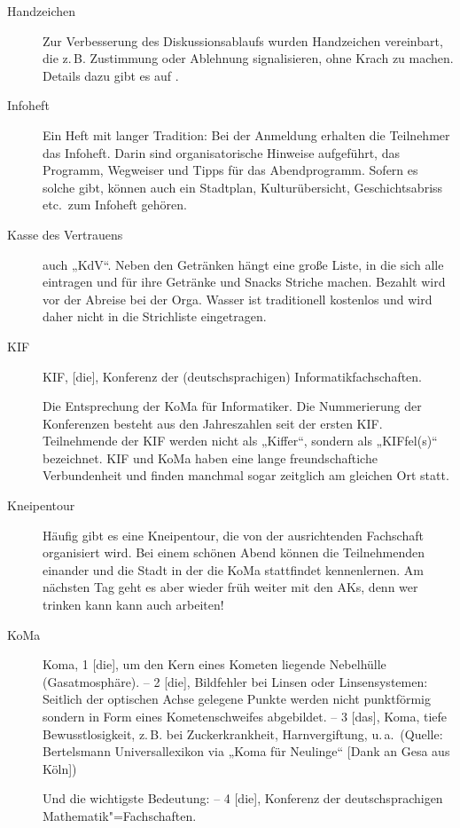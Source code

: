 \begin{description}
\item[Handzeichen]
    Zur Verbesserung des Diskussionsablaufs wurden Handzeichen vereinbart, die z.\,B. Zustimmung oder Ablehnung signalisieren, ohne Krach	zu machen. Details dazu gibt es auf .

\item[Infoheft]
    Ein Heft mit langer Tradition: Bei der Anmeldung erhalten die Teilnehmer das Infoheft. Darin sind organisatorische Hinweise aufgeführt, das Programm, Wegweiser und Tipps für das Abendprogramm. Sofern es solche gibt, können auch ein Stadtplan, Kulturübersicht,	Geschichtsabriss etc.\ zum Infoheft gehören.

\item[Kasse des Vertrauens]
    auch „KdV“. Neben den Getränken hängt eine große Liste, in die sich alle eintragen und für ihre Getränke und Snacks Striche machen.  Bezahlt wird vor der Abreise bei der Orga.  Wasser ist traditionell kostenlos und wird daher nicht in die Strichliste eingetragen.	

\item[KIF]
    KIF, [die], Konferenz der (deutschsprachigen) Informatikfachschaften.

	Die Entsprechung der KoMa für Informatiker. Die Nummerierung der Konferenzen besteht aus den Jahreszahlen seit der ersten KIF. Teilnehmende der KIF werden nicht als „Kiffer“, sondern als „KIFfel(s)“ bezeichnet. KIF und KoMa haben eine lange freundschaftiche Verbundenheit und finden manchmal sogar zeitglich am gleichen Ort statt.

\item[Kneipentour]
    Häufig gibt es eine Kneipentour, die von der ausrichtenden Fachschaft organisiert wird. Bei einem schönen Abend können die Teilnehmenden einander und die Stadt in der die KoMa stattfindet kennenlernen. Am nächsten Tag geht es aber wieder früh weiter mit den AKs, denn wer trinken kann kann auch arbeiten!

\item[KoMa]
    Koma, 1 [die], um den Kern eines Kometen liegende Nebelhülle (Gasatmosphäre). -- 2 [die], Bildfehler bei Linsen oder Linsensystemen: Seitlich der optischen Achse gelegene Punkte werden nicht punktförmig sondern in Form eines Kometenschweifes abgebildet. -- 3 [das], Koma, tiefe Bewusstlosigkeit, z.\,B. bei Zuckerkrankheit, Harnvergiftung, u.\,a.\ (Quelle: Bertelsmann Universallexikon via „Koma für Neulinge“ [Dank an Gesa aus Köln])

	Und die wichtigste Bedeutung: -- 4 [die], Konferenz der deutschsprachigen Mathematik"=Fachschaften.


\end{description}

